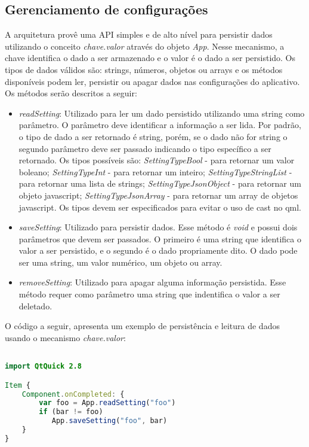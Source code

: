 \subsection{Gerenciamento de configurações}
A arquitetura provê uma API simples e de alto nível para persistir dados utilizando o conceito \textit{chave.valor} através do objeto \textit{App}. Nesse mecanismo, a chave identifica o dado a ser armazenado e o valor é o dado a ser persistido. Os tipos de dados válidos são: strings, números, objetos ou arrays e os métodos disponíveis podem ler, persistir ou apagar dados nas configurações do aplicativo. Os métodos serão descritos a seguir:
	\begin{itemize}
		\item \textit{readSetting}: Utilizado para ler um dado persistido utilizando uma string como parâmetro. O parâmetro deve identificar a informação a ser lida. Por padrão, o tipo de dado a ser retornado é string, porém, se o dado não for string o segundo parâmetro deve ser passado indicando o tipo específico a ser retornado. Os tipos possíveis são: \textit{SettingTypeBool} - para retornar um valor boleano; \textit{SettingTypeInt} - para retornar um inteiro; \textit{SettingTypeStringList} - para retornar uma lista de strings; \textit{SettingTypeJsonObject} - para retornar um objeto javascript; \textit{SettingTypeJsonArray} - para retornar um array de objetos javascript. Os tipos devem ser especificados para evitar o uso de cast no qml.

		\item \textit{saveSetting}: Utilizado para persistir dados. Esse método é \textit{void} e possui dois parâmetros que devem ser passados. O primeiro é uma string que identifica o valor a ser persistido, e o segundo é o dado propriamente dito. O dado pode ser uma string, um valor numérico, um objeto ou array.

		\item \textit{removeSetting}: Utilizado para apagar alguma informação persistida. Esse método requer como parâmetro uma string que indentifica o valor a ser deletado.
	\end{itemize}

O código a seguir, apresenta um exemplo de persistência e leitura de dados usando o mecanismo \textit{chave.valor}:

\begin{center}
\begin{lstlisting}[language=qml]

import QtQuick 2.8

Item {
    Component.onCompleted: {
		var foo = App.readSetting("foo")
		if (bar != foo)
		   App.saveSetting("foo", bar)
    }
}
\end{lstlisting}
\end{center}


